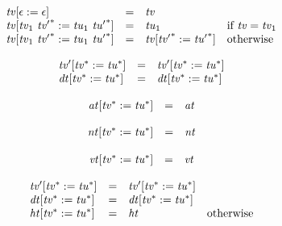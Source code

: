 $$
\begin{array}[t]{@{}lcl@{}l@{}}
{{\mathit{tv}}}{{}[ \epsilon := \epsilon ]} & = & {\mathit{tv}} \\
{{\mathit{tv}}}{{}[ {\mathit{tv}}_1~{{\mathit{tv}'}^\ast} := {\mathit{tu}}_1~{{\mathit{tu}'}^\ast} ]} & = & {\mathit{tu}}_1 & \quad \mbox{if}~ {\mathit{tv}} = {\mathit{tv}}_1 \\
{{\mathit{tv}}}{{}[ {\mathit{tv}}_1~{{\mathit{tv}'}^\ast} := {\mathit{tu}}_1~{{\mathit{tu}'}^\ast} ]} & = & {{\mathit{tv}}}{{}[ {{\mathit{tv}'}^\ast} := {{\mathit{tu}'}^\ast} ]} & \quad \mbox{otherwise} \\
\end{array}
$$

$$
\begin{array}[t]{@{}lcl@{}l@{}}
{{\mathit{tv}'}}{{}[ {{\mathit{tv}}^\ast} := {{\mathit{tu}}^\ast} ]} & = & {{\mathit{tv}'}}{{}[ {{\mathit{tv}}^\ast} := {{\mathit{tu}}^\ast} ]} \\
{{\mathit{dt}}}{{}[ {{\mathit{tv}}^\ast} := {{\mathit{tu}}^\ast} ]} & = & {{\mathit{dt}}}{{}[ {{\mathit{tv}}^\ast} := {{\mathit{tu}}^\ast} ]} \\
\end{array}
$$

$$
\begin{array}[t]{@{}lcl@{}l@{}}
{{\mathit{at}}}{{}[ {{\mathit{tv}}^\ast} := {{\mathit{tu}}^\ast} ]} & = & {\mathit{at}} \\
\end{array}
$$

$$
\begin{array}[t]{@{}lcl@{}l@{}}
{{\mathit{nt}}}{{}[ {{\mathit{tv}}^\ast} := {{\mathit{tu}}^\ast} ]} & = & {\mathit{nt}} \\
\end{array}
$$

$$
\begin{array}[t]{@{}lcl@{}l@{}}
{{\mathit{vt}}}{{}[ {{\mathit{tv}}^\ast} := {{\mathit{tu}}^\ast} ]} & = & {\mathit{vt}} \\
\end{array}
$$

$$
\begin{array}[t]{@{}lcl@{}l@{}}
{{\mathit{tv}'}}{{}[ {{\mathit{tv}}^\ast} := {{\mathit{tu}}^\ast} ]} & = & {{\mathit{tv}'}}{{}[ {{\mathit{tv}}^\ast} := {{\mathit{tu}}^\ast} ]} \\
{{\mathit{dt}}}{{}[ {{\mathit{tv}}^\ast} := {{\mathit{tu}}^\ast} ]} & = & {{\mathit{dt}}}{{}[ {{\mathit{tv}}^\ast} := {{\mathit{tu}}^\ast} ]} \\
{{\mathit{ht}}}{{}[ {{\mathit{tv}}^\ast} := {{\mathit{tu}}^\ast} ]} & = & {\mathit{ht}} & \quad \mbox{otherwise} \\
\end{array}
$$

